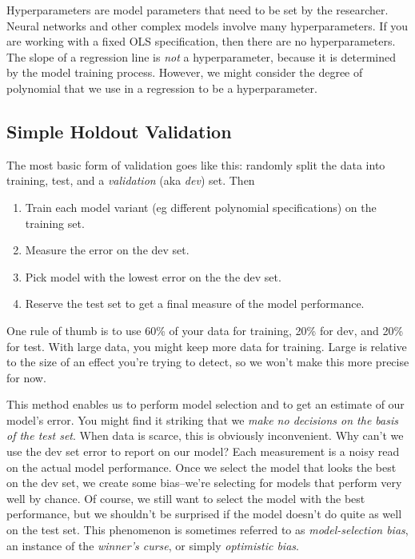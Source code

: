Hyperparameters are model parameters that need to be set by the researcher. Neural networks and other complex models involve many hyperparameters. If you are working with a fixed OLS specification, then there are no hyperparameters. The slope of a regression line is \textit{not} a hyperparameter, because it is determined by the model training process. However, we might consider the degree of polynomial that we use in a regression to be a hyperparameter.

\subsection{Simple Holdout Validation}

The most basic form of validation goes like this: randomly split the data into training, test, and a \textit{validation} (aka \textit{dev}) set. Then

\begin{enumerate}
\item Train each model variant (eg different polynomial specifications) on the training set.
\item Measure the error on the dev set.
\item Pick model with the lowest error on the the dev set.
\item Reserve the test set to get a final measure of the model performance.
\end{enumerate}

One rule of thumb is to use 60\% of your data for training, 20\% for dev, and 20\% for test. With large data, you might keep more data for training. Large is relative to the size of an effect you're trying to detect, so we won't make this more precise for now.

This method enables us to perform model selection and to get an estimate of our model's error. You might find it striking that we \textit{make no decisions on the basis of the test set}. When data is scarce, this is obviously inconvenient. Why can't we use the dev set error to report on our model? Each measurement is a noisy read on the actual model performance. Once we select the model that looks the best on the dev set, we create some bias--we're selecting for models that perform very well by chance. Of course, we still want to select the model with the best performance, but we shouldn't be surprised if the model doesn't do quite as well on the test set. This phenomenon is sometimes referred to as \textit{model-selection bias}, an instance of the \textit{winner's curse}, or simply \textit{optimistic bias}.

